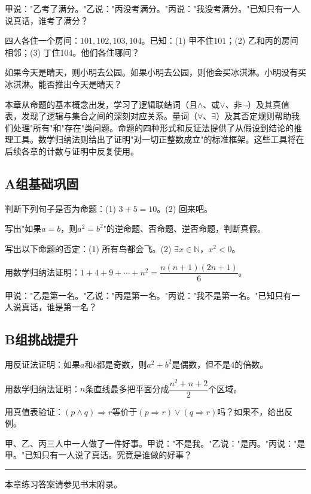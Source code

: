\begin{exercise}
\item 甲说："乙考了满分。"乙说："丙没考满分。"丙说："我没考满分。"已知只有一人说真话，谁考了满分？
\item 四人各住一个房间：$101,102,103,104$。已知：(1) 甲不住$101$；(2) 乙和丙的房间相邻；(3) 丁住$104$。他们各住哪间？
\item 如果今天是晴天，则小明去公园。如果小明去公园，则他会买冰淇淋。小明没有买冰淇淋。能否推出今天是晴天？
\end{exercise}


本章从命题的基本概念出发，学习了逻辑联结词（且$\land$、或$\lor$、非$\lnot$）及其真值表，发现了逻辑与集合之间的深刻对应关系。量词（$\forall$、$\exists$）及其否定规则帮助我们处理"所有"和"存在"类问题。命题的四种形式和反证法提供了从假设到结论的推理工具。数学归纳法则给出了证明"对一切正整数成立"的标准框架。这些工具将在后续各章的计数与证明中反复使用。


\subsection*{A组\quad 基础巩固}

\begin{exercise}
\item 判断下列句子是否为命题：(1) $3+5=10$。\qquad (2) 回来吧。
\item 写出"如果$a=b$，则$a^2=b^2$"的逆命题、否命题、逆否命题，判断真假。
\item 写出以下命题的否定：(1) 所有鸟都会飞。\qquad (2) $\exists x\in\mathbb N$，$x^2<0$。
\item 用数学归纳法证明：$1+4+9+\cdots+n^2=\dfrac{n(n+1)(2n+1)}{6}$。
\item 甲说："乙是第一名。"乙说："丙是第一名。"丙说："我不是第一名。"已知只有一人说真话，谁是第一名？
\end{exercise}

\subsection*{B组\quad 挑战提升}

\begin{exercise}
\item 用反证法证明：如果$a$和$b$都是奇数，则$a^2+b^2$是偶数，但不是$4$的倍数。
\item 用数学归纳法证明：$n$条直线最多把平面分成$\dfrac{n^2+n+2}{2}$个区域。
\item 用真值表验证：$(p\land q)\Rightarrow r$等价于$(p\Rightarrow r)\lor(q\Rightarrow r)$吗？如果不，给出反例。
\item 甲、乙、丙三人中一人做了一件好事。甲说："不是我。"乙说："是丙。"丙说："是甲。"已知只有一人说了真话。究竟是谁做的好事？
\end{exercise}

\vfill
\noindent\rule{\textwidth}{0.4pt}
本章练习答案请参见书末附录。
